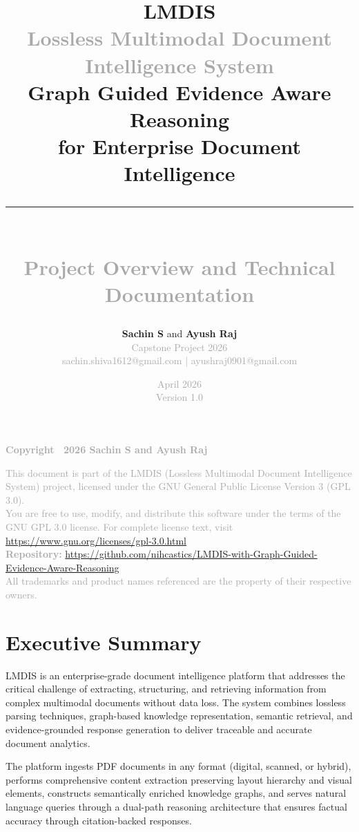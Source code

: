 \documentclass[11pt,a4paper]{article}
\title{
    \vspace{2cm}
    \textcolor{primary}{\Huge\textbf{LMDIS}}\\[0.5cm]
    \textcolor{darkgray}{\Large Lossless Multimodal Document Intelligence System}\\[1cm]
    \textcolor{secondary}{\Large Graph Guided Evidence Aware Reasoning}\\[0.5cm]
    \textcolor{secondary}{\Large for Enterprise Document Intelligence}\\[2cm]
    \rule{\textwidth}{2pt}\\[1cm]
    \textcolor{darkgray}{\large Project Overview and Technical Documentation}\\[2cm]
}
\author{
    \textbf{Sachin S} \quad and \quad \textbf{Ayush Raj}\\[0.3cm]
    \textcolor{darkgray}{Capstone Project 2026}\\[0.3cm]
    \textcolor{darkgray}{\small sachin.shiva1612@gmail.com \quad | \quad ayushraj0901@gmail.com}
}
\date{
    \textcolor{darkgray}{April 2026}\\[0.3cm]
    \textcolor{darkgray}{\small Version 1.0}
}
\begin{document}
\maketitle
\thispagestyle{empty}

\clearpage
\thispagestyle{empty}
\vspace*{\fill}
\begin{center}
    \textcolor{darkgray}{\textbf{Copyright \textcopyright\ 2026 Sachin S and Ayush Raj}}\\[1cm]
    
    \parbox{0.8\textwidth}{
        \textcolor{darkgray}{This document is part of the LMDIS (Lossless Multimodal Document Intelligence System) project, licensed under the GNU General Public License Version 3 (GPL 3.0).}\\[0.5cm]
        
        \textcolor{darkgray}{You are free to use, modify, and distribute this software under the terms of the GNU GPL 3.0 license. For complete license text, visit \url{https://www.gnu.org/licenses/gpl-3.0.html}}\\[1cm]
        
        \textcolor{darkgray}{\textbf{Repository:} \url{https://github.com/nihcastics/LMDIS-with-Graph-Guided-Evidence-Aware-Reasoning}}\\[1cm]
        
        \textcolor{darkgray}{All trademarks and product names referenced are the property of their respective owners.}
    }
\end{center}
\vspace*{\fill}

\clearpage
\tableofcontents
\thispagestyle{fancy}

\clearpage
\section{Executive Summary}

LMDIS is an enterprise-grade document intelligence platform that addresses the critical challenge of extracting, structuring, and retrieving information from complex multimodal documents without data loss. The system combines lossless parsing techniques, graph-based knowledge representation, semantic retrieval, and evidence-grounded response generation to deliver traceable and accurate document analytics.

The platform ingests PDF documents in any format (digital, scanned, or hybrid), performs comprehensive content extraction preserving layout hierarchy and visual elements, constructs semantically enriched knowledge graphs, and serves natural language queries through a dual-path reasoning architecture that ensures factual accuracy through citation-backed responses.
\end{document}

